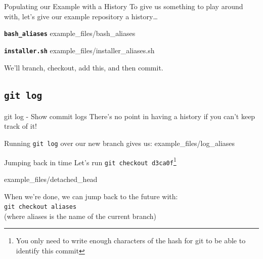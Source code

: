 \documentclass[aspectratio=43]{beamer}
\begin{document}
\begin{frame}[fragile]{Populating our Example with a History}
    To give us something to play around with, let's give our example repository
    a history\ldots

    \vspace{.5cm}

    \texttt{\textbf{bash\_aliases}}
        {example_files/bash_aliases}
    
    \texttt{\textbf{installer.sh}}
        {example_files/installer_aliases.sh}

    We'll branch, checkout, add this, and then commit.
\end{frame}

\subsection{\texttt{git log}}

\begin{frame}{git log - Show commit logs}
    There's no point in having a history if you can't keep track of it!
    
    Running \texttt{git log} over our new branch gives us:
        {example_files/log_aliases}
\end{frame}

\begin{frame}{Jumping back in time}
    Let's run \texttt{git checkout d3ca0f}\footnote{You only need to write
    enough characters of the hash for git to be able to identify this commit}

        {example_files/detached_head}

    When we're done, we can jump back to the future with:\\
    \texttt{git checkout aliases}\\
    (where aliases is the name of the current branch)
\end{frame}
\end{document}
